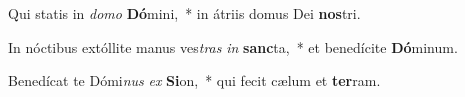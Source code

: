 \item Qui statis in \textit{do}\textit{mo} \textbf{Dó}mini,~* in átriis domus Dei \textbf{nos}tri.
\item In nóctibus extóllite manus ves\textit{tras} \textit{in} \textbf{sanc}ta,~* et benedícite \textbf{Dó}minum.
\item Benedícat te Dómi\textit{nus} \textit{ex} \textbf{Si}on,~* qui fecit cælum et \textbf{ter}ram.
